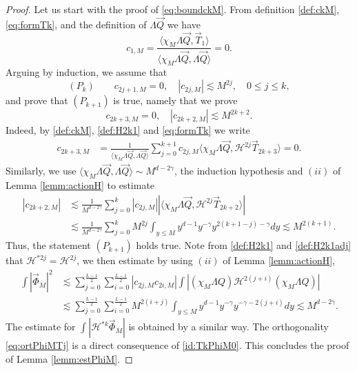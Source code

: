 \documentclass[11pt]{aims}
\theoremstyle{definition}
\numberwithin{equation}{section}
\begin{document}
\begin{proof} Let us start with the proof of \eqref{eq:boundckM}. From definition \eqref{def:ckM}, \eqref{eq:formTk}, and the definition of $\Lambda \vec Q$ we have $$c_{1,M} = \frac{\big\langle \chi_M \Lambda \vec Q, \vec T_1\big \rangle}{\big\langle \chi_M \Lambda \vec Q, \Lambda \vec Q\big \rangle} = 0.$$
Arguing by induction, we assume that
\begin{equation*}
(P_k) \qquad c_{2j + 1, M} = 0, \quad |c_{2j,M}| \lesssim M^{2j}, \quad 0 \leq j \leq k,
\end{equation*}
and prove that $(P_{k+1})$ is true, namely that we prove 
$$c_{2k + 3,M} = 0, \quad |c_{2k + 2, M}| \lesssim M^{2k + 2}.$$
Indeed, by \eqref{def:ckM}, \eqref{def:H2k1} and \eqref{eq:formTk} we write 
\begin{align*}
c_{2k + 3, M} &= \frac{1}{\big\langle \chi_M \Lambda \vec Q, \Lambda \vec Q\big \rangle}\sum_{j = 0}^{k + 1}c_{2j,M} \big\langle \chi_M \Lambda \vec Q, {\mathscr{H}}^{2j}\vec T_{2k + 3}\big\rangle = 0.
\end{align*}
Similarly, we use $\big \langle \chi_M \Lambda \vec Q, \Lambda \vec Q \big \rangle \sim M^{d-2\gamma}$, the induction hypothesis and $(ii)$ of Lemma \ref{lemm:actionH} to estimate 
\begin{align*}
|c_{2k + 2, M}| &\lesssim  \frac{1}{M^{d - 2\gamma}} \sum_{j = 0}^k |c_{2j,M}|\left|\big \langle \chi_M \Lambda \vec Q, {\mathscr{H}}^{2j}\vec T_{2k + 2} \big \rangle \right|\\
&\lesssim \frac{1}{M^{d - 2\gamma}}\sum_{j = 0}^k M^{2j} \int_{y \leq M}y^{d-1}y^{-\gamma}y^{2(k+1 - j) - \gamma}dy \lesssim M^{2(k+1)}.
\end{align*}
Thus, the statement $(P_{k+1})$ holds true. 
Note from \eqref{def:H2k1} and \eqref{def:H2k1adj} that ${\mathscr{H}}^{*2j} = {\mathscr{H}}^{2j}$, we then estimate by using $(ii)$ of Lemma \ref{lemm:actionH},
\begin{align*}
\int |\vec \Phi_M|^2 &\lesssim \sum_{j = 0}^{\frac{L-1}{2}} \sum_{i = 0}^{\frac{L-1}{2}} |c_{2j,M}c_{2i,M}|\int|(\chi_M \Lambda Q){\mathscr{H}}^{2(j+i)}(\chi_M \Lambda Q)|\\
&\lesssim \sum_{j = 0}^{\frac{L-1}{2}} \sum_{i = 0}^{\frac{L-1}{2}} M^{2(i + j)} \int_{y \leq M}y^{d-1}y^{-\gamma}y^{ - \gamma-2(j + i)}dy  \lesssim M^{d-2\gamma}.
\end{align*}
The estimate for $\int |{\mathscr{H}}^{*k} \vec \Phi_M|$ is obtained by a similar way. The orthogonality \eqref{eq:ortPhiMTj} is a direct consequence of \eqref{id:TkPhiM0}. This concludes the proof of Lemma \ref{lemm:estPhiM}.
\end{proof}
\end{document}

